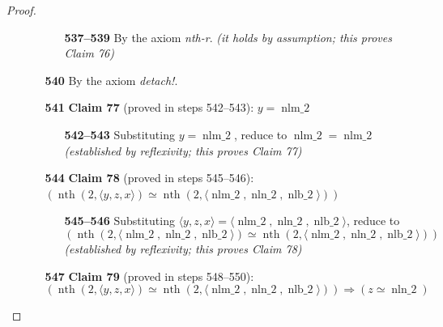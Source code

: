 \documentclass[11pt]{article}
\theoremstyle{plain}
\begin{document}
\begin{proof}
\begin{itemize}[leftmargin=2.8em, itemsep=4pt, parsep=1pt]
\begin{itemize}[leftmargin=2.8em, itemsep=4pt, parsep=1pt]
  \begin{itemize}[leftmargin=2.8em, itemsep=4pt, parsep=1pt]
  \item[\textbf{537--539}] By the axiom \emph{nth-r}.  \emph{(it holds by assumption; this proves Claim 76)}
  \end{itemize}
  \item[\textbf{540}] By the axiom \emph{detach!}.
  \item[\textbf{541}] \textbf{Claim 77} (proved in steps 542--543): $y = \operatorname{nlm\_2}$
  \begin{itemize}[leftmargin=2.8em, itemsep=4pt, parsep=1pt]
  \item[\textbf{542--543}] Substituting $y = \operatorname{nlm\_2}$, reduce to $\operatorname{nlm\_2} = \operatorname{nlm\_2}$  \emph{(established by reflexivity; this proves Claim 77)}
  \end{itemize}
  \item[\textbf{544}] \textbf{Claim 78} (proved in steps 545--546): $(\operatorname{nth}(2, \langle y, z, x \rangle) \simeq \operatorname{nth}(2, \langle \operatorname{nlm\_2}, \operatorname{nln\_2}, \operatorname{nlb\_2} \rangle))$
  \begin{itemize}[leftmargin=2.8em, itemsep=4pt, parsep=1pt]
  \item[\textbf{545--546}] Substituting $\langle y, z, x \rangle = \langle \operatorname{nlm\_2}, \operatorname{nln\_2}, \operatorname{nlb\_2} \rangle$, reduce to
\begin{equation*}
(\operatorname{nth}(2, \langle \operatorname{nlm\_2}, \operatorname{nln\_2}, \operatorname{nlb\_2} \rangle) \simeq \operatorname{nth}(2, \langle \operatorname{nlm\_2}, \operatorname{nln\_2}, \operatorname{nlb\_2} \rangle))
\end{equation*}
  \emph{(established by reflexivity; this proves Claim 78)}
  \end{itemize}
  \item[\textbf{547}] \textbf{Claim 79} (proved in steps 548--550):
\begin{equation*}
(\operatorname{nth}(2, \langle y, z, x \rangle) \simeq \operatorname{nth}(2, \langle \operatorname{nlm\_2}, \operatorname{nln\_2}, \operatorname{nlb\_2} \rangle)) \Rightarrow (z \simeq \operatorname{nln\_2})
\end{equation*}


\end{itemize}
\end{itemize}
\end{proof}
\end{document}

